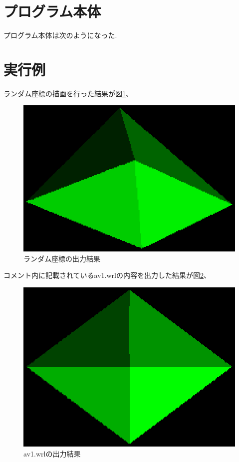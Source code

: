 \documentclass[a4j,dvipdfmx]{jsarticle}
\begin{document}
\section{プログラム本体}
プログラム本体は次のようになった.



\section{実行例}
ランダム座標の描画を行った結果が図\ref{fig:random}、
\begin{figure}[htbp]
  \begin{center}
        \includegraphics[clip,scale=0.7]{images/random.eps}
        \caption{ランダム座標の出力結果}
        \label{fig:random}
  \end{center}
\end{figure}
コメント内に記載されているav1.wrlの内容を出力した結果が図\ref{fig:av1}、
\begin{figure}[htbp]
  \begin{center}
        \includegraphics[clip,scale=0.7]{images/av1.eps}
        \caption{av1.wrlの出力結果}
        \label{fig:av1}
  \end{center}
\end{figure}
\end{document}
